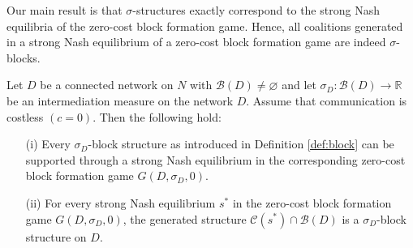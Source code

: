 Our main result is that $\sigma$-structures exactly correspond to the strong Nash equilibria of the zero-cost block formation game. Hence, all coalitions generated in a strong Nash equilibrium of a zero-cost block formation game are indeed $\sigma$-blocks.
\begin{theorem} \label{thm:SNE-block}
Let $D$ be a connected network on $N$ with $\mathcal{B} (D) \neq \varnothing$ and let $\sigma_D \colon \mathcal{B} (D) \to \mathbb{R}$ be an intermediation measure on the network $D$. Assume that communication is costless $(c=0)$. Then the following hold:
\begin{itemize}
\item[(i)] Every $\sigma_D$-block structure as introduced in Definition \ref{def:block} can be supported through a strong Nash equilibrium in the corresponding zero-cost block formation game $G (D, \sigma_D ,0)$.

\item[(ii)] For every strong Nash equilibrium $s^*$ in the zero-cost block formation game $G (D, \sigma_D ,0)$, the generated structure $\mathcal{C} (s^*) \cap \mathcal{B} (D)$ is a $\sigma_D$-block structure on $D$.
\end{itemize}
\end{theorem}
